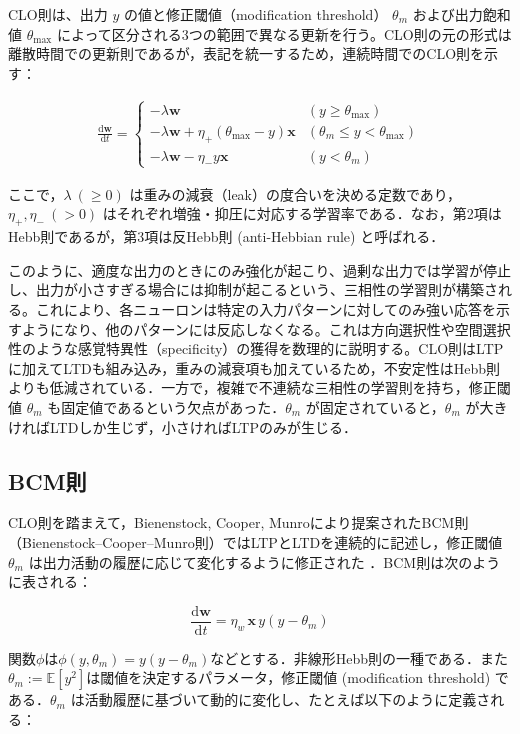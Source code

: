 \documentclass[titlepage]{ltjsbook}
\begin{document}
CLO則は、出力 $y$ の値と修正閾値（modification threshold） $\theta_m$ および出力飽和値 $\theta_\mathrm{max}$ によって区分される3つの範囲で異なる更新を行う。CLO則の元の形式は離散時間での更新則であるが，表記を統一するため，連続時間でのCLO則を示す：

\begin{align}
\frac{\mathrm{d}\mathbf{w}}{\mathrm{d}t} =
\begin{cases}
- \lambda \mathbf{w} & (y \geq \theta_{\max}) \\
- \lambda \mathbf{w} + \eta_+ (\theta_{\max} - y) \mathbf{x} & (\theta_m \leq y < \theta_{\max}) \\
- \lambda \mathbf{w} - \eta_- y \mathbf{x} & (y < \theta_m)
\end{cases}
\end{align}

ここで，$\lambda\ (\geq 0)$ は重みの減衰（leak）の度合いを決める定数であり，$\eta_+, \eta_-\ (> 0)$ はそれぞれ増強・抑圧に対応する学習率である．なお，第2項はHebb則であるが，第3項は反Hebb則 (anti-Hebbian rule) と呼ばれる．

このように、適度な出力のときにのみ強化が起こり、過剰な出力では学習が停止し、出力が小さすぎる場合には抑制が起こるという、三相性の学習則が構築される。これにより、各ニューロンは特定の入力パターンに対してのみ強い応答を示すようになり、他のパターンには反応しなくなる。これは方向選択性や空間選択性のような感覚特異性（specificity）の獲得を数理的に説明する。CLO則はLTPに加えてLTDも組み込み，重みの減衰項も加えているため，不安定性はHebb則よりも低減されている．一方で，複雑で不連続な三相性の学習則を持ち，修正閾値 $\theta_m$ も固定値であるという欠点があった．$\theta_m$ が固定されていると，$\theta_m$ が大きければLTDしか生じず，小さければLTPのみが生じる．

\subsection{BCM則}
CLO則を踏まえて，Bienenstock, Cooper, Munroにより提案されたBCM則（Bienenstock–Cooper–Munro則）ではLTPとLTDを連続的に記述し，修正閾値 $\theta_m$ は出力活動の履歴に応じて変化するように修正された \citep{Bienenstock1982-km,Cooper2012-ec}．BCM則は次のように表される：

\begin{equation}
\frac{\mathrm{d}\mathbf{w}}{\mathrm{d}t} = \eta_w \, \mathbf{x} \, y (y - \theta_m)
\end{equation}

関数$\phi$は$\phi(y, \theta_m)=y(y-\theta_m)$などとする．非線形Hebb則の一種である．また $\theta_m:=\mathbb{E}[y^2]$は閾値を決定するパラメータ，修正閾値 (modification threshold) である．$\theta_m$ は活動履歴に基づいて動的に変化し、たとえば以下のように定義される：
\end{document}
